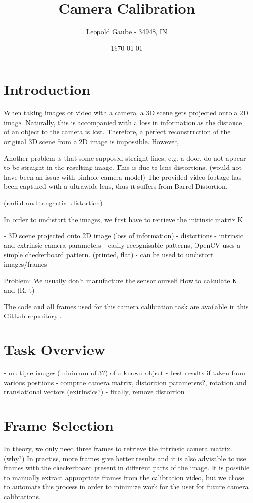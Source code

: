 \documentclass[bibliography=totoc]{scrartcl}
\title{Camera Calibration}
\author{Leopold Gaube - 34948, IN}
\date{\today}
\begin{document}
\maketitle
\tableofcontents

\clearpage

\section{Introduction}

When taking images or video with a camera, a 3D scene gets projected onto a 2D image.
Naturally, this is accompanied with a loss in information as the distance of an object to the camera is lost.
Therefore, a perfect reconstruction of the original 3D scene from a 2D image is impossible. 
However, ...

Another problem is that some supposed straight lines, e.g. a door, do not appear to be straight in the resulting image. 
This is due to lens distortions. (would not have been an issue with pinhole camera model) 
The provided video footage has been captured with a ultrawide lens, thus it suffers from Barrel Distortion.

(radial and tangential distortion)

In order to undistort the images, we first have to retrieve the intrinsic matrix K 


- 3D scene projected onto 2D image (loss of information)
- distortions
- intrinsic and extrinsic camera parameters
- easily recognisable patterns, OpenCV uses a simple checkerboard pattern. (printed, flat)
- can be used to undistort images/frames

Problem: We usually don't manufacture the sensor ourself
How to calculate K and (R, t)

\cite{OpenCV}
The code and all frames used for this camera calibration task are available in this \href{https://gitlab.com/gaubeleo/camera-calibration}{GitLab repository} \cite{Gitlab}.


\section{Task Overview}
- multiple images (minimum of 3?) of a known object
- best results if taken from various positions
- compute camera matrix, distorition parameters?, rotation and translational vectors (extrinsics?)
- finally, remove distortion

\section{Frame Selection}
In theory, we only need three frames to retrieve the intrinsic camera matrix. (why?)
In practise, more frames give better results and it is also advisable to use frames with the checkerboard present in different parts of the image.
It is possible to manually extract appropriate frames from the calibration video, but we chose to automate this process in order to minimize work for the user for future camera calibrations. 
\end{document}
